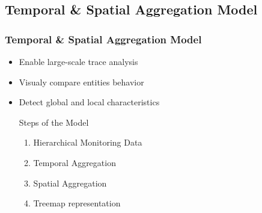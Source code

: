 \subsection{Temporal \& Spatial Aggregation Model}


\frame
{
   \frametitle{Temporal \& Spatial Aggregation Model}
   \begin{itemize}
   \item Enable large-scale trace analysis
   \item Visualy compare entities behavior
   \item Detect global and local characteristics

   \vfill

   \begin{block}{Steps of the Model}
      \begin{enumerate}
      \item Hierarchical Monitoring Data
      \item Temporal Aggregation
      \item Spatial Aggregation
      \item Treemap representation
      \end{enumerate}
   \end{block}

   \end{itemize}
}

%
%
%

